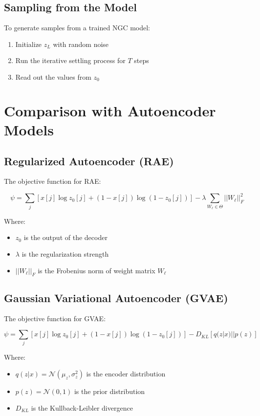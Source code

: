 \documentclass{article}
\begin{document}
\subsection{Sampling from the Model}

To generate samples from a trained NGC model:

\begin{enumerate}
  \item Initialize $z_L$ with random noise
  \item Run the iterative settling process for $T$ steps
  \item Read out the values from $z_0$
\end{enumerate}

\section{Comparison with Autoencoder Models}

\subsection{Regularized Autoencoder (RAE)}

The objective function for RAE:

\begin{equation}
  \psi = \sum_j [x[j] \log z_0[j] + (1-x[j]) \log(1-z_0[j])] - \lambda \sum_{W_\ell \in \Theta} ||W_\ell||_F^2
\end{equation}

Where:
\begin{itemize}
  \item $z_0$ is the output of the decoder
  \item $\lambda$ is the regularization strength
  \item $||W_\ell||_F$ is the Frobenius norm of weight matrix $W_\ell$
\end{itemize}

\subsection{Gaussian Variational Autoencoder (GVAE)}

The objective function for GVAE:

\begin{equation}
  \psi = \sum_j [x[j] \log z_0[j] + (1-x[j]) \log(1-z_0[j])] - D_{KL}[q(z|x) || p(z)]
\end{equation}

Where:
\begin{itemize}
  \item $q(z|x) = \mathcal{N}(\mu_z, \sigma_z^2)$ is the encoder distribution
  \item $p(z) = \mathcal{N}(0, 1)$ is the prior distribution
  \item $D_{KL}$ is the Kullback-Leibler divergence
\end{itemize}
\end{document}
